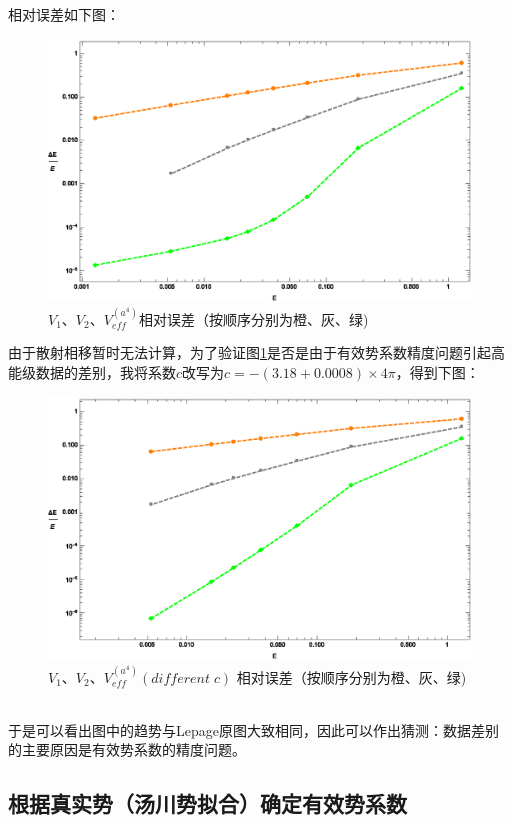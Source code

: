 \documentclass[hyperref,cs4size,titlepage,twoside]{ctexart}
\begin{document}
相对误差如下图：

\begin{figure}[!htbp]
  \centering
  \includegraphics[width=5.2in]{Test_LepageFigure_2.eps}
  \caption{$V_1$、$V_2$、$V_{eff}^{(a^4)}$相对误差（按顺序分别为橙、灰、绿)}\label{relative error 2}
\end{figure}
由于散射相移暂时无法计算，为了验证图\ref{relative error 2}是否是由于有效势系数精度问题引起高能级数据的差别，我将系数$c$改写为$c=-(3.18+0.0008)\times4\pi$，得到下图：
\begin{figure}[!htbp]
  \centering
  \includegraphics[width=5.2in]{Test_LepageFigure_2_2.eps}
  \caption{$V_1$、$V_2$、$V_{eff}^{(a^4)}(different\;c)$ 相对误差（按顺序分别为橙、灰、绿)}\label{relative error 2_2}
\end{figure}\\
于是可以看出图中的趋势与Lepage原图大致相同，因此可以作出猜测：数据差别的主要原因是有效势系数的精度问题。
\subsection{根据真实势（汤川势拟合）确定有效势系数}
\end{document}
